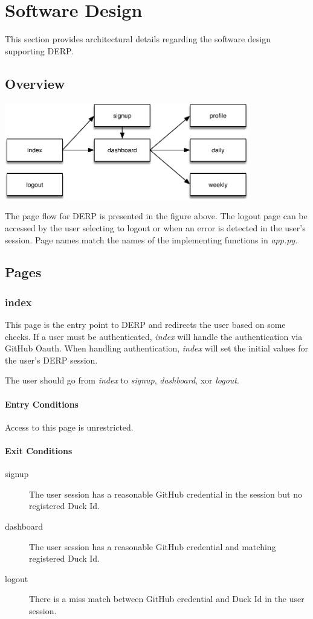 \chapter*{Software Design}
This section provides architectural details regarding the software design supporting DERP.

\section*{Overview}
\begin{center}
\includegraphics[width=0.8\textwidth]{./pageflow.pdf}
\end{center}

The page flow for DERP is presented in the figure above. The logout page can be accessed by the user selecting to logout or when an error is detected in the user's session. Page names match the names of the implementing functions in \emph{app.py}.

\section*{Pages}
\subsection*{index}
This page is the entry point to DERP and redirects the user based on some checks. If a user must be authenticated, \emph{index} will handle the authentication via GitHub Oauth. 
When handling authentication, \emph{index} will set the initial values for the user's DERP session.

The user should go from \emph{index} to \emph{signup}, \emph{dashboard}, xor \emph{logout}.

\subsubsection*{Entry Conditions}
Access to this page is unrestricted.

\subsubsection*{Exit Conditions}
\begin{description}
\item[signup] The user session has a reasonable GitHub credential in the session but no registered Duck Id.
\item[dashboard] The user session has a reasonable GitHub credential and matching registered Duck Id.
\item[logout] There is a miss match between GitHub credential and Duck Id in the user session.
\end{description}



